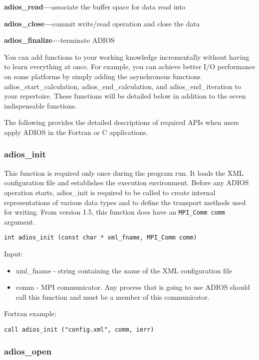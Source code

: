 \textbf{adios\_read---}associate the buffer space for data read into

\textbf{adios\_close---}commit write/read operation and close the data

\textbf{adios\_finalize---}terminate ADIOS

You can add functions to your working knowledge incrementally without having to 
learn everything at once. For example, you can achieve better I/O performance on 
some platforms by simply adding the asynchronous functions adios\_start\_calculation, 
adios\_end\_calculation, and adios\_end\_iteration to your repertoire. These functions 
will be detailed below in addition to the seven indispensable functions.

The following provides the detailed descriptions of required APIs when users apply 
ADIOS in the Fortran or C applications.

\subsubsection{adios\_init}

This function is required only once during the program run. 
It loads the XML configuration file 
and establishes the execution environment. Before any ADIOS operation starts, adios\_init 
is required to be called to create internal representations of various data types 
and to define the transport methods used for writing. 
From version 1.5, this function does have an \verb+MPI_Comm comm+ 
argument. 

\begin{lstlisting}[alsolanguage=C]
int adios_init (const char * xml_fname, MPI_Comm comm)
\end{lstlisting}

Input: 
\begin{itemize}
\item xml\_fname - string containing the name of the XML configuration file
\item comm - MPI communicator. Any process that is going to use ADIOS should call this function and must be a member of this communicator. 
\end{itemize}

Fortran example: 
\begin{lstlisting}[alsolanguage=Fortran]
call adios_init ("config.xml", comm, ierr)
\end{lstlisting}

\subsubsection{adios\_open}

